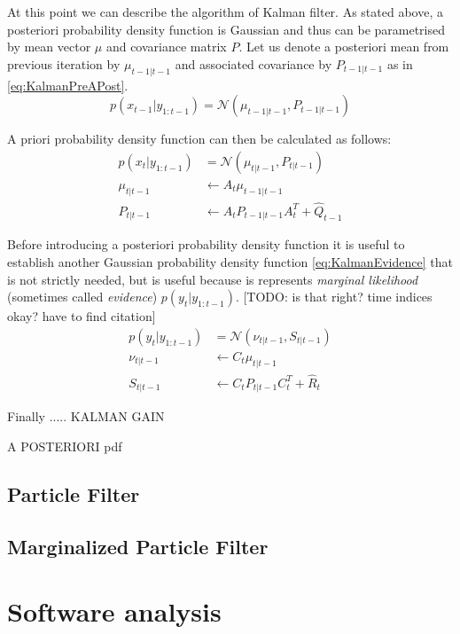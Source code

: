 \documentclass[a4paper,12pt,oneside]{report}
\newcommand{\pdf}{probability density function}
\begin{document}
At this point we can describe the algorithm of Kalman filter. As stated above, a posteriori {\pdf}
is Gaussian and thus can be parametrised by mean vector \(\mu\) and covariance matrix \(P\). Let us
denote a posteriori mean from previous iteration by \(\mu_{t-1|t-1}\) and associated covariance by
\(P_{t-1|t-1}\) as in \eqref{eq:KalmanPreAPost}.
\begin{equation} \label{eq:KalmanPreAPost}
	p(x_{t-1} | y_{1:t-1}) = \mathcal{N}(\mu_{t-1|t-1}, P_{t-1|t-1})
\end{equation}

A priori {\pdf} can then be calculated as follows:~\cite{AruMasGor:02}
\begin{align}
	p(x_t | y_{1:t-1}) &= \mathcal{N}(\mu_{t|t-1}, P_{t|t-1}) \label{eq:KalmanAPost} \\
	\mu_{t|t-1} &\leftarrow A_t \mu_{t-1|t-1} \\
	P_{t|t-1} &\leftarrow A_t P_{t-1|t-1} A_t^T + \hat{Q}_{t-1}
\end{align}

Before introducing a posteriori {\pdf} it is useful to establish another Gaussian {\pdf}
\eqref{eq:KalmanEvidence} that is not strictly needed, but is useful because is represents
\emph{marginal likelihood} (sometimes called \emph{evidence}) \(p(y_t|y_{1:t-1})\). %
[TODO: is that right? time indices okay? have to find citation]
\begin{align}
	p(y_t|y_{1:t-1}) &= \mathcal{N}(\nu_{t|t-1}, S_{t|t-1}) \label{eq:KalmanEvidence} \\
	\nu_{t|t-1} &\leftarrow C_t \mu_{t|t-1} \\
	S_{t|t-1} &\leftarrow C_t P_{t|t-1} C_t^T + \hat{R}_t
\end{align}

Finally ..... KALMAN GAIN

A POSTERIORI pdf


\section{Particle Filter}

\section{Marginalized Particle Filter}


\chapter{Software analysis}
\end{document}
